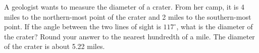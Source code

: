 { A geologist wants to measure the diameter of a crater.   From her camp, it is 4 miles to the northern-most point of the crater and 2 miles to the southern-most point.  If the angle between the two lines of sight is $117^{\circ}$, what is the diameter of the crater?  Round your answer to the nearest hundredth of a mile.}
{ The diameter of the crater is about 5.22 miles.}
